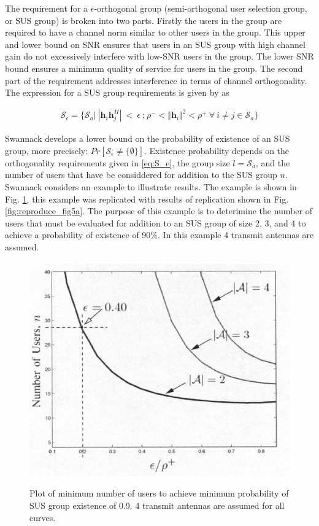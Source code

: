
The requirement for a $\epsilon$-orthogonal group (semi-orthogonal user selection group, or SUS group) is broken into two parts. Firstly the users in the group are required to have a channel norm similar to other users in the group. This upper and lower bound on SNR ensures that users in an SUS group with high channel gain do not excessively interfere with low-SNR users in the group. The lower SNR bound ensures a minimum quality of service for users in the group. The second part of the requirement addresses interference in terms of channel orthogonality. The expression for a SUS group requirements is given by as

\begin{equation}\label{eq:S_e}
    \begin{aligned}
        \mathcal{S}_\epsilon = \lbrace \mathcal{S}_a \big|\ | \textbf{h}_i\textbf{h}_j^H |\ <\ \epsilon \ \text{;} \ \rho^-<\Vert \textbf{h}_i \Vert^2 < \rho^+\ \forall \ i \neq j \in \mathcal{S}_a \rbrace
    \end{aligned}
\end{equation}

Swannack develops a lower bound on the probability of existence of an SUS group, more precisely: $Pr[\mathcal{S}_\epsilon \neq \lbrace \emptyset \rbrace]$. Existence probability depends on the orthogonality requirements given in \ref{eq:S_e}, the group size $l = \mathcal{S}_a$, and the number of users that have be considdered for addition to the SUS group $n$. Swannack considers an example to illustrate results. The example is shown in Fig. \ref{fig:swannack_fig5a}, this example was replicated with results of replication shown in Fig. \ref{fig:reproduce_fig5a}. The purpose of this example is to deterimine the number of users that must be evaluated for addition to an SUS group of size 2, 3, and 4 to achieve a probability of existence of 90\%. In this example 4 transmit antennas are assumed.

\begin{figure}
    \includegraphics[width=12cm]{figs/swannack_fig5a.png}\\
    \caption{Plot of minimum number of users to achieve minimum probability of SUS group existence of 0.9. 4 transmit antennas are assumed for all curves.}
    \label{fig:swannack_fig5a}
\end{figure}

